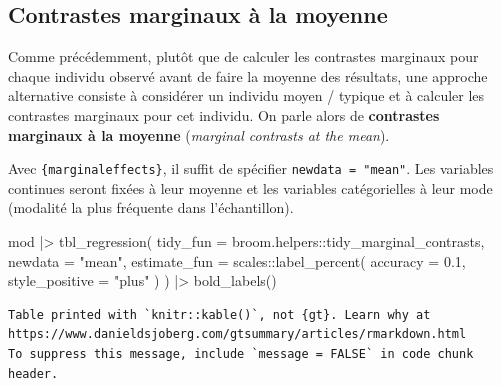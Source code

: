 \documentclass[
  letterpaper,
  DIV=11,
  numbers=noendperiod,
  oneside]{scrreprt}
\newenvironment{Shaded}{\begin{snugshade}}{\end{snugshade}}
\newcommand{\AttributeTok}[1]{\textcolor[rgb]{0.40,0.45,0.13}{#1}}
\newcommand{\FloatTok}[1]{\textcolor[rgb]{0.68,0.00,0.00}{#1}}
\newcommand{\FunctionTok}[1]{\textcolor[rgb]{0.28,0.35,0.67}{#1}}
\newcommand{\NormalTok}[1]{\textcolor[rgb]{0.00,0.23,0.31}{#1}}
\newcommand{\SpecialCharTok}[1]{\textcolor[rgb]{0.37,0.37,0.37}{#1}}
\newcommand{\StringTok}[1]{\textcolor[rgb]{0.13,0.47,0.30}{#1}}
\begin{document}
\hypertarget{contrastes-marginaux-uxe0-la-moyenne}{%
\subsection{Contrastes marginaux à la
moyenne}\label{contrastes-marginaux-uxe0-la-moyenne}}

Comme précédemment, plutôt que de calculer les contrastes marginaux pour
chaque individu observé avant de faire la moyenne des résultats, une
approche alternative consiste à considérer un individu moyen / typique
et à calculer les contrastes marginaux pour cet individu. On parle alors
de \textbf{contrastes marginaux à la moyenne} (\emph{marginal contrasts
at the mean}).

Avec \texttt{\{marginaleffects\}}, il suffit de spécifier
\texttt{newdata\ =\ "mean"}. Les variables continues seront fixées à
leur moyenne et les variables catégorielles à leur mode (modalité la
plus fréquente dans l'échantillon).

\begin{Shaded}
\begin{Highlighting}[]
\NormalTok{mod }\SpecialCharTok{|\textgreater{}} 
  \FunctionTok{tbl\_regression}\NormalTok{(}
    \AttributeTok{tidy\_fun =}\NormalTok{ broom.helpers}\SpecialCharTok{::}\NormalTok{tidy\_marginal\_contrasts,}
    \AttributeTok{newdata =} \StringTok{"mean"}\NormalTok{,}
    \AttributeTok{estimate\_fun =}\NormalTok{ scales}\SpecialCharTok{::}\FunctionTok{label\_percent}\NormalTok{(}
      \AttributeTok{accuracy =} \FloatTok{0.1}\NormalTok{,}
      \AttributeTok{style\_positive =} \StringTok{"plus"}
\NormalTok{    )}
\NormalTok{  ) }\SpecialCharTok{|\textgreater{}} 
  \FunctionTok{bold\_labels}\NormalTok{()}
\end{Highlighting}
\end{Shaded}

\begin{verbatim}
Table printed with `knitr::kable()`, not {gt}. Learn why at
https://www.danieldsjoberg.com/gtsummary/articles/rmarkdown.html
To suppress this message, include `message = FALSE` in code chunk header.
\end{verbatim}
\end{document}
